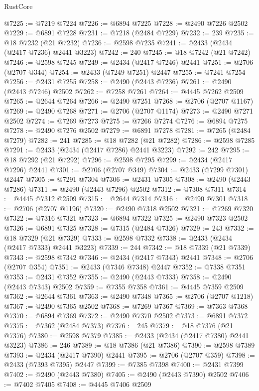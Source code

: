 \begin{lexlean}{RustCore}
\begin{coremodule}
@7225 := @7219 @7224
@7226 := @6894 @7225
@7228 := @2490 @7226 @2502
@7229 := @6891 @7228
@7231 := @7218 (@2484 @7229)
@7232 := 239
@7235 := @18 @7232 (@21 @7232)
@7236 := @2598 @7235
@7241 := @2433 (@2434 (@2417 @7236) @2441 @3223)
@7242 := 240
@7245 := @18 @7242 (@21 @7242)
@7246 := @2598 @7245
@7249 := @2434 (@2417 @7246) @2441
@7251 := @2706 (@2707 @344)
@7254 := @2433 (@7249 @7251) @2447
@7255 := @7241 @7254
@7256 := @2431 @7255
@7258 := @2490 (@2443 @7236)
@7261 := @2490 (@2443 @7246) @2502
@7262 := @7258 @7261
@7264 := @4445 @7262 @2509
@7265 := @2644 @7264
@7266 := @2490 @7251
@7268 := @2706 (@2707 @1167)
@7269 := @2490 @7268
@7271 := @2706 (@2707 @1174)
@7273 := @2490 @7271 @2502
@7274 := @7269 @7273
@7275 := @7266 @7274
@7276 := @6894 @7275
@7278 := @2490 @7276 @2502
@7279 := @6891 @7278
@7281 := @7265 (@2484 @7279)
@7282 := 241
@7285 := @18 @7282 (@21 @7282)
@7286 := @2598 @7285
@7291 := @2433 (@2434 (@2417 @7286) @2441 @3223)
@7292 := 242
@7295 := @18 @7292 (@21 @7292)
@7296 := @2598 @7295
@7299 := @2434 (@2417 @7296) @2441
@7301 := @2706 (@2707 @349)
@7304 := @2433 (@7299 @7301) @2447
@7305 := @7291 @7304
@7306 := @2431 @7305
@7308 := @2490 (@2443 @7286)
@7311 := @2490 (@2443 @7296) @2502
@7312 := @7308 @7311
@7314 := @4445 @7312 @2509
@7315 := @2644 @7314
@7316 := @2490 @7301
@7318 := @2706 (@2707 @1196)
@7320 := @2490 @7318 @2502
@7321 := @7269 @7320
@7322 := @7316 @7321
@7323 := @6894 @7322
@7325 := @2490 @7323 @2502
@7326 := @6891 @7325
@7328 := @7315 (@2484 @7326)
@7329 := 243
@7332 := @18 @7329 (@21 @7329)
@7333 := @2598 @7332
@7338 := @2433 (@2434 (@2417 @7333) @2441 @3223)
@7339 := 244
@7342 := @18 @7339 (@21 @7339)
@7343 := @2598 @7342
@7346 := @2434 (@2417 @7343) @2441
@7348 := @2706 (@2707 @354)
@7351 := @2433 (@7346 @7348) @2447
@7352 := @7338 @7351
@7353 := @2431 @7352
@7355 := @2490 (@2443 @7333)
@7358 := @2490 (@2443 @7343) @2502
@7359 := @7355 @7358
@7361 := @4445 @7359 @2509
@7362 := @2644 @7361
@7363 := @2490 @7348
@7365 := @2706 (@2707 @1218)
@7367 := @2490 @7365 @2502
@7368 := @7269 @7367
@7369 := @7363 @7368
@7370 := @6894 @7369
@7372 := @2490 @7370 @2502
@7373 := @6891 @7372
@7375 := @7362 (@2484 @7373)
@7376 := 245
@7379 := @18 @7376 (@21 @7376)
@7380 := @2598 @7379
@7385 := @2433 (@2434 (@2417 @7380) @2441 @3223)
@7386 := 246
@7389 := @18 @7386 (@21 @7386)
@7390 := @2598 @7389
@7393 := @2434 (@2417 @7390) @2441
@7395 := @2706 (@2707 @359)
@7398 := @2433 (@7393 @7395) @2447
@7399 := @7385 @7398
@7400 := @2431 @7399
@7402 := @2490 (@2443 @7380)
@7405 := @2490 (@2443 @7390) @2502
@7406 := @7402 @7405
@7408 := @4445 @7406 @2509

\end{coremodule}
\end{lexlean}
